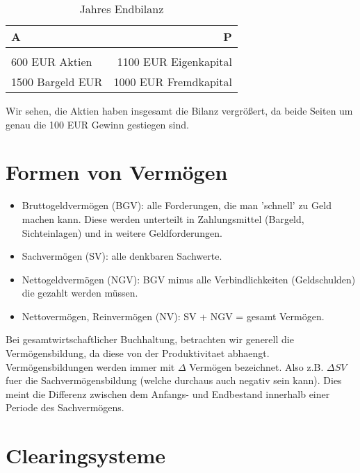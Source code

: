 \documentclass[a4paper]{article}
\begin{document}
\begin{table}
	\centering
	\caption{Jahres Endbilanz}
	\label{tab:label}
	\begin{tabular}{l|r}
		A                & P                     \\
		\hline                                   \\
		600 EUR Aktien   & 1100 EUR Eigenkapital \\
		1500 Bargeld EUR & 1000 EUR Fremdkapital \\
	\end{tabular}
\end{table}

Wir sehen, die Aktien haben insgesamt die Bilanz vergrößert, da beide Seiten
um genau die 100 EUR Gewinn gestiegen sind.

\section{Formen von Vermögen}

\begin{itemize}
	\item Bruttogeldvermögen (BGV): alle Forderungen, die man 'schnell' zu Geld machen
	      kann. Diese werden unterteilt in Zahlungsmittel
	      (Bargeld, Sichteinlagen) und in weitere Geldforderungen.

	\item Sachvermögen (SV): alle denkbaren Sachwerte.

	\item Nettogeldvermögen (NGV): BGV minus alle Verbindlichkeiten (Geldschulden)
	      die gezahlt werden müssen.

	\item Nettovermögen, Reinvermögen (NV): SV + NGV = gesamt Vermögen.
\end{itemize}

Bei gesamtwirtschaftlicher Buchhaltung, betrachten wir generell die
Vermögensbildung, da diese von der Produktivitaet abhaengt.
\\

Verm\"ogensbildungen werden immer mit $\Delta$ Verm\"ogen bezeichnet. Also
z.B. $\Delta SV$ fuer die Sachvermögensbildung (welche durchaus auch negativ
sein kann). Dies meint die Differenz
zwischen dem Anfangs- und Endbestand innerhalb einer Periode des Sachvermögens.

\section{Clearingsysteme}
\end{document}
